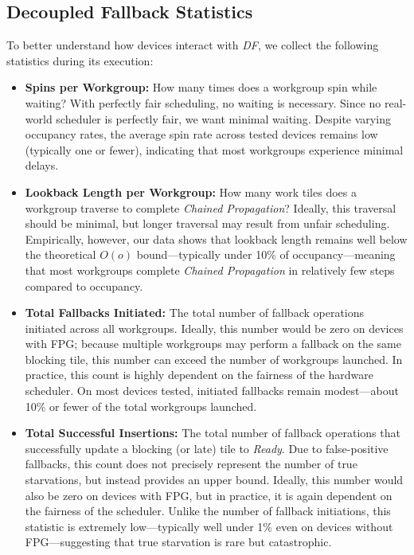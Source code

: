 \documentclass[acmsmall, manuscript, screen, review, anonymous]{acmart}
\begin{document}
\subsection{Decoupled Fallback Statistics}
To better understand how devices interact with \emph{DF}, we collect the following statistics during its execution: 

\begin{itemize} 
  \item \textbf{Spins per Workgroup:} How many times does a workgroup spin while waiting? With perfectly fair scheduling, no waiting is necessary. Since no real-world scheduler is perfectly fair, we want minimal waiting. Despite varying occupancy rates, the average spin rate across tested devices remains low (typically one or fewer), indicating that most workgroups experience minimal delays.

  \item \textbf{Lookback Length per Workgroup:} How many work tiles does a workgroup traverse to complete \emph{Chained Propagation}? Ideally, this traversal should be minimal, but longer traversal may result from unfair scheduling. Empirically, however, our data shows that lookback length remains well below the theoretical $O(o)$ bound---typically under 10\% of occupancy---meaning that most workgroups complete \emph{Chained Propagation} in relatively few steps compared to occupancy.
  
  \item \textbf{Total Fallbacks Initiated:} The total number of fallback operations initiated across all workgroups. Ideally, this number would be zero on devices with FPG; because multiple workgroups may perform a fallback on the same blocking tile, this number can exceed the number of workgroups launched. In practice, this count is highly dependent on the fairness of the hardware scheduler. On most devices tested, initiated fallbacks remain modest---about 10\% or fewer of the total workgroups launched.
  
  \item \textbf{Total Successful Insertions:} The total number of fallback operations that successfully update a blocking (or late) tile to \emph{Ready}. Due to false-positive fallbacks, this count does not precisely represent the number of true starvations, but instead provides an upper bound. Ideally, this number would also be zero on devices with FPG, but in practice, it is again dependent on the fairness of the scheduler. Unlike the number of fallback initiations, this statistic is extremely low---typically well under 1\% even on devices without FPG---suggesting that true starvation is rare but catastrophic.
\end{itemize}
\end{document}
